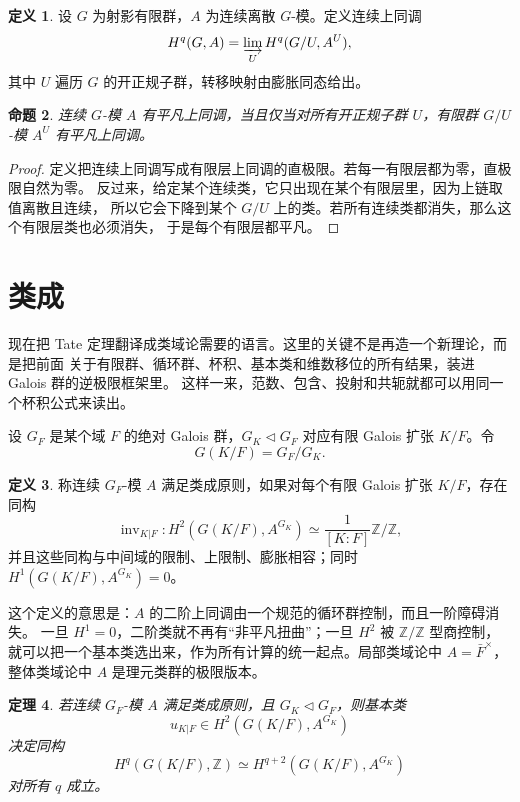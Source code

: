 \documentclass[11pt,a4paper,openany]{ctexbook}
\numberwithin{equation}{chapter}
\newcommand{\Z}{\mathbb{Z}}
\theoremstyle{plain}
\newtheorem{theorem}{定理}[chapter]
\newtheorem{proposition}[theorem]{命题}
\theoremstyle{definition}
\newtheorem{definition}[theorem]{定义}
\theoremstyle{remark}
\begin{document}
\begin{definition}
设 $G$ 为射影有限群，$A$ 为连续离散 $G$-模。定义连续上同调
\[
 H^q(G,A)=\varinjlim_U H^q(G/U,A^U),
\]
其中 $U$ 遍历 $G$ 的开正规子群，转移映射由膨胀同态给出。
\end{definition}

\begin{proposition}
连续 $G$-模 $A$ 有平凡上同调，当且仅当对所有开正规子群 $U$，有限群 $G/U$-模 $A^U$ 有平凡上同调。
\end{proposition}

\begin{proof}
定义把连续上同调写成有限层上同调的直极限。若每一有限层都为零，直极限自然为零。
反过来，给定某个连续类，它只出现在某个有限层里，因为上链取值离散且连续，
所以它会下降到某个 $G/U$ 上的类。若所有连续类都消失，那么这个有限层类也必须消失，
于是每个有限层都平凡。
\end{proof}

\section{类成}

现在把 Tate 定理翻译成类域论需要的语言。这里的关键不是再造一个新理论，而是把前面
关于有限群、循环群、杯积、基本类和维数移位的所有结果，装进 Galois 群的逆极限框架里。
这样一来，范数、包含、投射和共轭就都可以用同一个杯积公式来读出。

设 $G_F$ 是某个域 $F$ 的绝对 Galois 群，$G_K\triangleleft G_F$ 对应有限 Galois 扩张 $K/F$。令
\[
 G(K/F)=G_F/G_K.
\]

\begin{definition}
称连续 $G_F$-模 $A$ 满足类成原则，如果对每个有限 Galois 扩张 $K/F$，存在同构
\[
 \operatorname{inv}_{K|F}:H^2(G(K/F),A^{G_K})
 \simeq \frac1{[K:F]}\Z/\Z,
\]
并且这些同构与中间域的限制、上限制、膨胀相容；同时 $H^1(G(K/F),A^{G_K})=0$。
\end{definition}

这个定义的意思是：$A$ 的二阶上同调由一个规范的循环群控制，而且一阶障碍消失。
一旦 $H^1=0$，二阶类就不再有“非平凡扭曲”；一旦 $H^2$ 被 $\Z/\Z$ 型商控制，
就可以把一个基本类选出来，作为所有计算的统一起点。局部类域论中 $A=\bar F^\times$，
整体类域论中 $A$ 是理元类群的极限版本。

\begin{theorem}
若连续 $G_F$-模 $A$ 满足类成原则，且 $G_K\triangleleft G_F$，则基本类
\[
 u_{K|F}\in H^2(G(K/F),A^{G_K})
\]
决定同构
\[
 H^q(G(K/F),\Z)\simeq H^{q+2}(G(K/F),A^{G_K})
\]
对所有 $q$ 成立。
\end{theorem}
\end{document}
